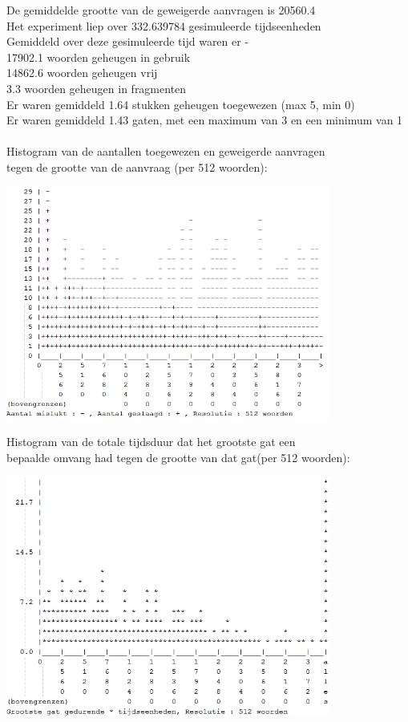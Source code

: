 \documentclass[a4paper]{article}
\begin{document}
De gemiddelde grootte van de geweigerde aanvragen is 20560.4\\
Het experiment liep over 332.639784 gesimuleerde tijdseenheden\\
Gemiddeld over deze gesimuleerde tijd waren er - \\
 17902.1 woorden geheugen in gebruik\\
 14862.6 woorden geheugen vrij\\
     3.3 woorden geheugen in fragmenten\\
Er waren gemiddeld     1.64 stukken geheugen toegewezen (max 5, min 0)\\
Er waren gemiddeld     1.43 gaten, met een maximum van 3 en een minimum van 1\\
\\
Histogram van de aantallen toegewezen en geweigerde aanvragen\\
tegen de grootte van de aanvraag (per 512 woorden):
\begin{center}
\includegraphics[width=0.8\textwidth]{wf1.png}
\end{center}
Histogram van de totale tijdsduur dat het grootste gat een\\
bepaalde omvang had tegen de grootte van dat gat(per 512 woorden):
\begin{center}
\includegraphics[width=0.8\textwidth]{wf2.png}
\end{center}
\end{document}

